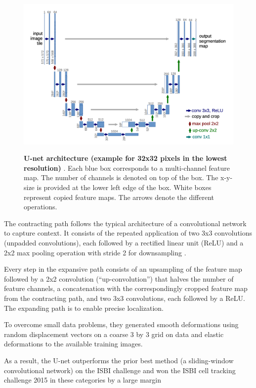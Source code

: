 \begin{figure}[t]
\begin{center}
\centering
\includegraphics[width=\textwidth]{thesis-template-master/images/unet.png}
\label{fig:cellnet}
\end{center}
\caption{\textbf{U-net architecture (example for 32x32 pixels in the lowest resolution)\cite{unet} }. Each blue box corresponds to a multi-channel feature map. The number of channels is denoted on top of the box. The x-y-size is provided at the lower left edge of the box. White boxes represent copied feature maps. The arrows denote the different operations.}
\end{figure}

The contracting path follows the typical architecture of a convolutional network to capture context. It consists of the repeated application of two 3x3 convolutions (unpadded convolutions), each followed by a rectified linear unit (ReLU) and a 2x2 max pooling operation with stride 2 for downsampling \cite{unet}.

Every step in the expansive path consists of an upsampling of the feature map followed by a 2x2 convolution (“up-convolution”) that halves the number of feature channels, a concatenation with the correspondingly cropped feature map from the contracting path, and two 3x3 convolutions, each followed by a ReLU\cite{unet}. The expanding path is to enable precise localization.

To overcome small data problems, they generated smooth deformations using random displacement vectors on a coarse 3 by 3 grid on data and elastic deformations to the available training images\cite{unet}.

As a result, the U-net outperforms the prior best method (a sliding-window convolutional network) on the ISBI challenge and  won the ISBI cell tracking challenge 2015 in these categories by a large margin \cite{unet}











